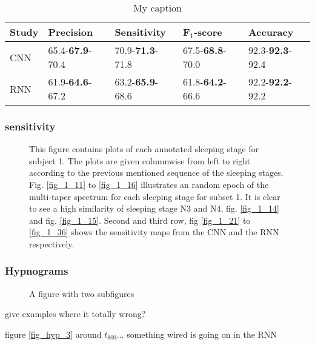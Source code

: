 \begin{table}[th!]
\centering
\begin{tabular}{l | llll}
Study & Precision & Sensitivity & F$_1$-score & Accuracy \\\hline
CNN               & 65.4-\textbf{67.9}-70.4 & 70.9-\textbf{71.3}-71.8 & 67.5-\textbf{68.8}-70.0 & 92.3-\textbf{92.3}-92.4\\
RNN               & 61.9-\textbf{64.6}-67.2 & 63.2-\textbf{65.9}-68.6 & 61.8-\textbf{64.2}-66.6 & 92.2-\textbf{92.2}-92.2
\end{tabular}
\caption{My caption}
\label{tb_res_2}
\end{table}




\subsubsection{sensitivity}


\begin{figure*}[th!]
\centering

\caption{This figure contains plots of each annotated sleeping stage for subject 1. The plots are given columnwise from left to right according to the previous mentioned sequence of the sleeping stages. Fig. \ref{fig_1_11} to \ref{fig_1_16} illustrates an random epoch of the multi-taper spectrum for each sleeping stage for subset 1. It is clear to see a high similarity of sleeping stage N3 and N4, fig. \ref{fig_1_14} and fig. \ref{fig_1_15}. Second and third row, fig \ref{fig_1_21} to \ref{fig_1_36} shows the sensitivity maps from the CNN and the RNN respectively.}
\label{fig_1}
\end{figure*}



\subsubsection{Hypnograms}


\begin{figure*}[th!]
\centering

\caption{A figure with two subfigures}
\label{fig_hyp}
\end{figure*}

give examples where it totally wrong?


figure \ref{fig_hyp_3} around $t_{800}$... something wired is going on in the RNN




